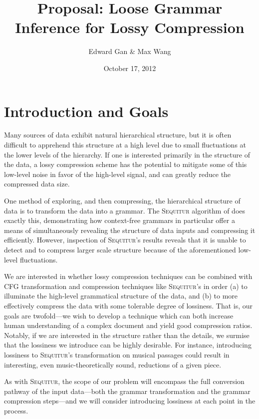\documentclass[11pt]{article}
\newcommand{\Sequitur}{\textsc{Sequitur}\xspace}
\begin{document}


\title{Proposal: Loose Grammar Inference for Lossy Compression}
\author{Edward Gan \& Max Wang}
\date{October 17, 2012}
\maketitle

\section{Introduction and Goals}

Many sources of data exhibit natural hierarchical structure, but it is often
difficult to apprehend this structure at a high level due to small fluctuations
at the lower levels of the hierarchy.  If one is interested primarily in the
structure of the data, a lossy compression scheme has the potential to mitigate
some of this low-level noise in favor of the high-level signal, and can greatly
reduce the compressed data size.

One method of exploring, and then compressing, the hierarchical structure of
data is to transform the data into a grammar.  The \Sequitur algorithm of
\cite{sequitur} does exactly this, demonstrating how context-free grammars in
particular offer a means of simultaneously revealing the structure of data
inputs and compressing it efficiently.  However, inspection of \Sequitur's
results reveals that it is unable to detect and to compress larger scale
structure because of the aforementioned low-level fluctuations.

We are interested in whether lossy compression techniques can be combined with
CFG transformation and compression techniques like \Sequitur's in order (a) to
illuminate the high-level grammatical structure of the data, and (b) to more
effectively compress the data with some tolerable degree of lossiness.  That
is, our goals are twofold---we wish to develop a technique which can both
increase human understanding of a complex document and yield good compression
ratios.  Notably, if we are interested in the structure rather than the
details, we surmise that the lossiness we introduce can be highly desirable.
For instance, introducing lossiness to \Sequitur's transformation on musical
passages could result in interesting, even music-theoretically sound,
reductions of a given piece.

As with \Sequitur, the scope of our problem will encompass the full conversion
pathway of the input data---both the grammar transformation and the grammar
compression steps---and we will consider introducing lossiness at each point in
the process.
\end{document}
